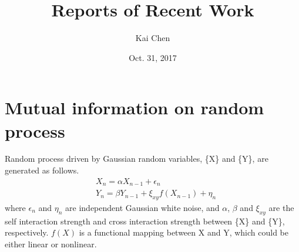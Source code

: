 \documentclass{article}
\title{Reports of Recent Work}
\author{Kai Chen}
\date{Oct. 31, 2017}
\begin{document}
	\maketitle
	\section{Mutual information on random process}
	Random process driven by Gaussian random variables, \{X\} and \{Y\}, are generated as follows.
	\begin{equation}
		\begin{aligned}
			&X_n = \alpha X_{n-1} + \epsilon_n \\
			&Y_n = \beta Y_{n-1} + \xi_{xy}f(X_{n - 1}) + \eta_n
		\end{aligned}
	\end{equation}
	where $\epsilon_n$ and $\eta_n$ are independent Gaussian white noise, and $\alpha$, $\beta$ and $\xi_{xy}$ are the self interaction strength and cross interaction strength between \{X\} and \{Y\}, respectively. $f(X)$ is a functional mapping between X and Y, which could be either linear or nonlinear.
\end{document}
